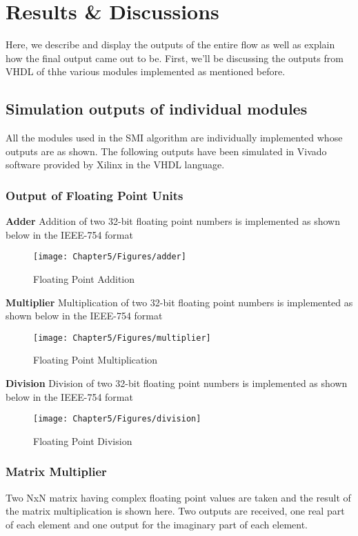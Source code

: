 \chapter{Results \& Discussions}
\indent\indent Here, we describe and display the outputs of the entire flow as well as explain how the final output came out to be. First, we'll be discussing the outputs from VHDL of thhe various modules implemented as mentioned before.

\section{Simulation outputs of individual modules}
All the modules used in the SMI algorithm are individually implemented whose outputs are as shown.
The following outputs have been simulated in Vivado software provided by Xilinx in the VHDL language.

\subsection{Output of Floating Point Units}
\textbf{Adder}
Addition of two 32-bit floating point numbers is implemented as shown below in the IEEE-754 format

\begin{figure}[h]
\centering
\texttt{[image: Chapter5/Figures/adder]}		
\caption{ \label{fig:1}Floating Point Addition}
\end{figure} 

\textbf{Multiplier}
Multiplication of two 32-bit floating point numbers is implemented as shown below in the IEEE-754 format

\begin{figure}[h]
\centering
\texttt{[image: Chapter5/Figures/multiplier]}		
\caption{ \label{fig:1}Floating Point Multiplication}
\end{figure} 

\textbf{Division}
Division of two 32-bit floating point numbers is implemented as shown below in the IEEE-754 format

\begin{figure}[h]
\centering
\texttt{[image: Chapter5/Figures/division]}		
\caption{ \label{fig:1}Floating Point Division}
\end{figure} 

\subsection{Matrix Multiplier}
Two NxN matrix having complex floating point values are taken and the result of the matrix multiplication is shown here. Two outputs are received, one real part of each element and one output for the imaginary part of each element.

